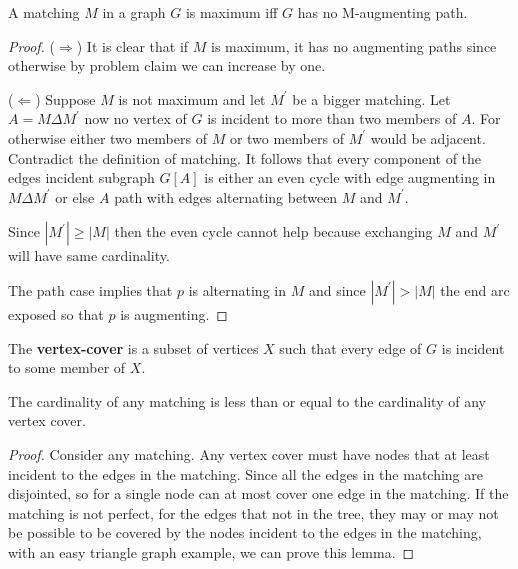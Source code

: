                 \begin{theorem}[Berge, 1957]
                    A matching $M$ in a graph $G$ is maximum iff $G$ has no M-augmenting path.
                \end{theorem}

                \begin{proof}
                    ($\Rightarrow$) It is clear that if $M$ is maximum, it has no augmenting paths since otherwise by problem claim we can increase by one.

                    ($\Leftarrow$) Suppose $M$ is not maximum and let $M^\prime$ be a bigger matching. Let $A = M \Delta M^\prime$ now no vertex of $G$ is incident to more than two members of $A$. For otherwise either two members of $M$ or two members of $M^\prime$ would be adjacent. Contradict the definition of matching. It follows that every component of the edges incident subgraph $G[A]$ is either an even cycle with edge augmenting in $M\Delta M^\prime$ or else $A$ path with edges alternating between $M$ and $M^\prime$.

                    Since $|M^\prime| \ge |M|$ then the even cycle cannot help because exchanging $M$ and $M^\prime$ will have same cardinality.

                    The path case implies that $p$ is alternating in $M$ and since $|M^\prime| > |M|$ the end arc exposed so that $p$ is augmenting.
                \end{proof}

                \begin{definition}
                    The \textbf{vertex-cover} is a subset of vertices $X$ such that every edge of $G$ is incident to some member of $X$.
                \end{definition}

                \begin{lemma}
                    The cardinality of any matching is less than or equal to the cardinality of any vertex cover.
                \end{lemma}

                \begin{proof}
                    Consider any matching. Any vertex cover must have nodes that at least incident to the edges in the matching. Since all the edges in the matching are disjointed, so for a single node can at most cover one edge in the matching. If the matching is not perfect, for the edges that not in the tree, they may or may not be possible to be covered by the nodes incident to the edges in the matching, with an easy triangle graph example, we can prove this lemma.
                \end{proof}

